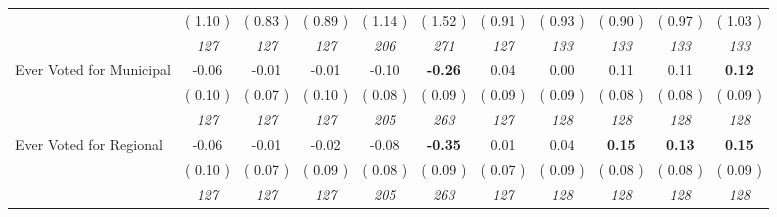 \begin{tabular}{l c c c c c c c c c c}
& (     1.10 ) & (     0.83 ) & (     0.89 ) & (     1.14 ) & (     1.52 ) & (     0.91 ) & (     0.93 ) & (     0.90 ) & (     0.97 ) & (     1.03 ) \\
& \textit{ 127 } & \textit{ 127 } & \textit{ 127 } & \textit{ 206 } & \textit{ 271 } & \textit{ 127 } & \textit{ 133 } & \textit{ 133 } & \textit{ 133 } & \textit{ 133 } \\
Ever Voted for Municipal &     -0.06 &     -0.01 &     -0.01 &     -0.10 & \textbf{     -0.26 } &      0.04 &      0.00 &      0.11 &      0.11 & \textbf{     0.12} \\
& (     0.10 ) & (     0.07 ) & (     0.10 ) & (     0.08 ) & (     0.09 ) & (     0.09 ) & (     0.09 ) & (     0.08 ) & (     0.08 ) & (     0.09 ) \\
& \textit{ 127 } & \textit{ 127 } & \textit{ 127 } & \textit{ 205 } & \textit{ 263 } & \textit{ 127 } & \textit{ 128 } & \textit{ 128 } & \textit{ 128 } & \textit{ 128 } \\
Ever Voted for Regional &     -0.06 &     -0.01 &     -0.02 &     -0.08 & \textbf{     -0.35 } &      0.01 &      0.04 & \textbf{      0.15 } & \textbf{      0.13 } & \textbf{     0.15} \\
& (     0.10 ) & (     0.07 ) & (     0.09 ) & (     0.08 ) & (     0.09 ) & (     0.07 ) & (     0.09 ) & (     0.08 ) & (     0.08 ) & (     0.09 ) \\
& \textit{ 127 } & \textit{ 127 } & \textit{ 127 } & \textit{ 205 } & \textit{ 263 } & \textit{ 127 } & \textit{ 128 } & \textit{ 128 } & \textit{ 128 } & \textit{ 128 } \\
\bottomrule
\end{tabular}

